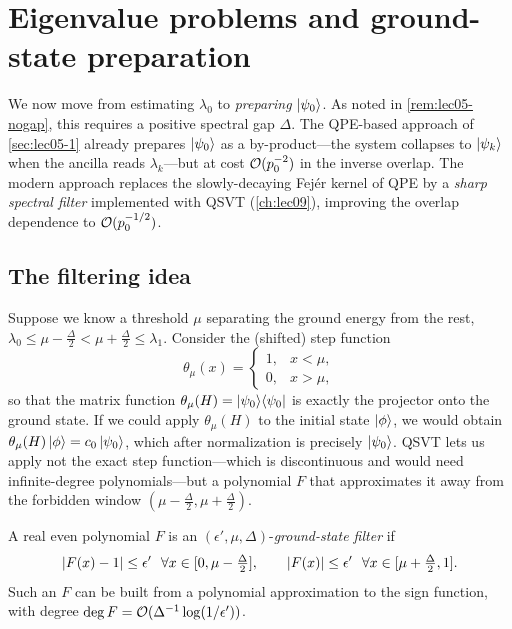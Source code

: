 \section{Eigenvalue problems and ground-state preparation}
\label{sec:lec05-3}

We now move from estimating $\lambda_0$ to \emph{preparing} $\ket{\psi_0}$. As
noted in \cref{rem:lec05-nogap}, this requires a positive spectral gap $\Delta$.
The QPE-based approach of \cref{sec:lec05-1} already prepares $\ket{\psi_0}$ as a
by-product---the system collapses to $\ket{\psi_k}$ when the ancilla reads
$\lambda_k$---but at cost $\mathcal{O}(p_0^{-2})$ in the inverse overlap. The modern
approach replaces the slowly-decaying Fej\'er kernel of QPE by a \emph{sharp
spectral filter} implemented with QSVT (\cref{ch:lec09}), improving the overlap
dependence to $\mathcal{O}(p_0^{-1/2})$.

\subsection*{The filtering idea}

Suppose we know a threshold $\mu$ separating the ground energy from the rest,
$\lambda_0\le\mu-\tfrac{\Delta}{2}<\mu+\tfrac{\Delta}{2}\le\lambda_1$. Consider
the (shifted) step function
\[
  \theta_\mu(x)=\begin{cases}1,& x<\mu,\\ 0,& x>\mu,\end{cases}
\]
so that the matrix function $\theta_\mu(H)=\ket{\psi_0}\!\bra{\psi_0}$ is exactly the projector
onto the ground state. If we could apply $\theta_\mu(H)$ to the initial state
$\ket{\phi}$, we would obtain $\theta_\mu(H)\ket{\phi}=c_0\ket{\psi_0}$, which
after normalization is precisely $\ket{\psi_0}$. QSVT lets us apply not the exact
step function---which is discontinuous and would need infinite-degree
polynomials---but a polynomial $F$ that approximates it away from the forbidden
window $(\mu-\tfrac{\Delta}{2},\mu+\tfrac{\Delta}{2})$.

\begin{definition}
\label{def:lec05-filter}
A real even polynomial $F$ is an $(\epsilon',\mu,\Delta)$-\emph{ground-state
filter} if
\[
  \abs{F(x)-1}\le\epsilon'\ \ \forall x\in[0,\mu-\tfrac{\Delta}{2}],
  \qquad
  \abs{F(x)}\le\epsilon'\ \ \forall x\in[\mu+\tfrac{\Delta}{2},1].
\]
Such an $F$ can be built from a polynomial approximation to the sign function,
with degree $\deg F=\mathcal{O}(\Delta^{-1}\log(1/\epsilon'))$.
\end{definition}

